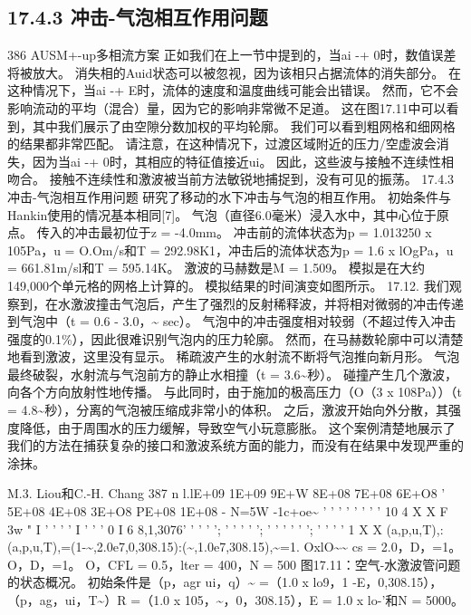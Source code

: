 \documentclass[UTF8,11pt,a4paper,openany,fontset=fandol]{ctexbook}
\begin{document}
\subsection{17.4.3 冲击-气泡相互作用问题}
386 AUSM+-up多相流方案 正如我们在上一节中提到的，当ai -+ 0时，数值误差将被放大。 消失相的Auid状态可以被忽视，因为该相只占据流体的消失部分。 在这种情况下，当ai -+ E时，流体的速度和温度曲线可能会出错误。 然而，它不会影响流动的平均（混合）量，因为它的影响非常微不足道。 这在图17.11中可以看到，其中我们展示了由空隙分数加权的平均轮廓。 我们可以看到粗网格和细网格的结果都非常匹配。 请注意，在这种情况下，过渡区域附近的压力/空虚波会消失，因为当ai -+ 0时，其相应的特征值接近ui。 因此，这些波与接触不连续性相吻合。 接触不连续性和激波被当前方法敏锐地捕捉到，没有可见的振荡。 17.4.3 冲击-气泡相互作用问题 研究了移动的水下冲击与气泡的相互作用。 初始条件与Hankin使用的情况基本相同[7]。 气泡（直径6.0毫米）浸入水中，其中心位于原点。 传入的冲击最初位于z = -4.0mm。 冲击前的流体状态为p = 1.013250 x 105Pa，u = O.Om/s和T = 292.98K1，冲击后的流体状态为p = 1.6 x lOgPa，u = 661.81m/sl和T = 595.14K。 激波的马赫数是M = 1.509。 模拟是在大约149,000个单元格的网格上计算的。 模拟结果的时间演变如图所示。 17.12. 我们观察到，在水激波撞击气泡后，产生了强烈的反射稀释波，并将相对微弱的冲击传递到气泡中（t = 0.6 - 3.0，\textasciitilde{} sec）。 气泡中的冲击强度相对较弱（不超过传入冲击强度的0.1\%），因此很难识别气泡内的压力轮廓。 然而，在马赫数轮廓中可以清楚地看到激波，这里没有显示。 稀疏波产生的水射流不断将气泡推向新月形。 气泡最终破裂，水射流与气泡前方的静止水相撞（t = 3.6\textasciitilde{}秒）。 碰撞产生几个激波，向各个方向放射性地传播。 与此同时，由于施加的极高压力（O（3 x 108Pa））（t = 4.8\textasciitilde{}秒），分离的气泡被压缩成非常小的体积。 之后，激波开始向外分散，其强度降低，由于周围水的压力缓解，导致空气小玩意膨胀。 这个案例清楚地展示了我们的方法在捕获复杂的接口和激波系统方面的能力，而没有在结果中发现严重的涂抹。

M.3. Liou和C.-H. Chang 387 n l.lE+09 1E+09 9E+W 8E+08 7E+08 6E+O8 ' 5E+08 4E+08 3E+O8 PE+08 1E+08 - N=5W -1c+oe\textasciitilde{} ' ' ' ' ' ' ' ' 10 4 X X F 3w " I ' ' ' ' I ' ' ' 0 I 6 8,1,3076' ' ' ' '; ' ' ' ' '; ' ' ' ' ' '; ' ' ' ' 1 X X (a,p,u,T),:(a,p,u,T),=(1-\textasciitilde{},2.0e7,0,308.15):(\textasciitilde{},1.0e7,308.15),\textasciitilde{}=1. OxlO\textasciitilde{}\textasciitilde{} cs = 2.0，D，=1。 O，D，=1。 O，CFL = 0.5，lter = 400，N = 500 图17.11：空气-水激波管问题的状态概况。 初始条件是（p，agr ui，q）\textasciitilde{} =（1.0 x lo9，1 -E，0,308.15），（p，ag，ui，T\textasciitilde{}）R =（1.0 x 105，\textasciitilde{}，0，308.15），E = 1.0 x lo-'和N = 5000。
\end{document}

